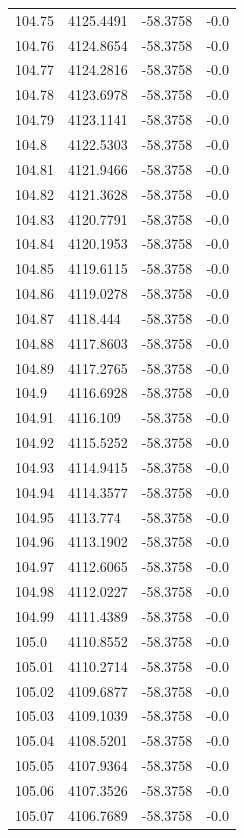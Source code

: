\begin{table}[H]
\begin{tabular}{llll}
104.75 & 4125.4491 & -58.3758 & -0.0 \\
104.76 & 4124.8654 & -58.3758 & -0.0 \\
104.77 & 4124.2816 & -58.3758 & -0.0 \\
104.78 & 4123.6978 & -58.3758 & -0.0 \\
104.79 & 4123.1141 & -58.3758 & -0.0 \\
104.8 & 4122.5303 & -58.3758 & -0.0 \\
104.81 & 4121.9466 & -58.3758 & -0.0 \\
104.82 & 4121.3628 & -58.3758 & -0.0 \\
104.83 & 4120.7791 & -58.3758 & -0.0 \\
104.84 & 4120.1953 & -58.3758 & -0.0 \\
104.85 & 4119.6115 & -58.3758 & -0.0 \\
104.86 & 4119.0278 & -58.3758 & -0.0 \\
104.87 & 4118.444 & -58.3758 & -0.0 \\
104.88 & 4117.8603 & -58.3758 & -0.0 \\
104.89 & 4117.2765 & -58.3758 & -0.0 \\
104.9 & 4116.6928 & -58.3758 & -0.0 \\
104.91 & 4116.109 & -58.3758 & -0.0 \\
104.92 & 4115.5252 & -58.3758 & -0.0 \\
104.93 & 4114.9415 & -58.3758 & -0.0 \\
104.94 & 4114.3577 & -58.3758 & -0.0 \\
104.95 & 4113.774 & -58.3758 & -0.0 \\
104.96 & 4113.1902 & -58.3758 & -0.0 \\
104.97 & 4112.6065 & -58.3758 & -0.0 \\
104.98 & 4112.0227 & -58.3758 & -0.0 \\
104.99 & 4111.4389 & -58.3758 & -0.0 \\
105.0 & 4110.8552 & -58.3758 & -0.0 \\
105.01 & 4110.2714 & -58.3758 & -0.0 \\
105.02 & 4109.6877 & -58.3758 & -0.0 \\
105.03 & 4109.1039 & -58.3758 & -0.0 \\
105.04 & 4108.5201 & -58.3758 & -0.0 \\
105.05 & 4107.9364 & -58.3758 & -0.0 \\
105.06 & 4107.3526 & -58.3758 & -0.0 \\
105.07 & 4106.7689 & -58.3758 & -0.0 \\

\end{tabular}
\end{table}
